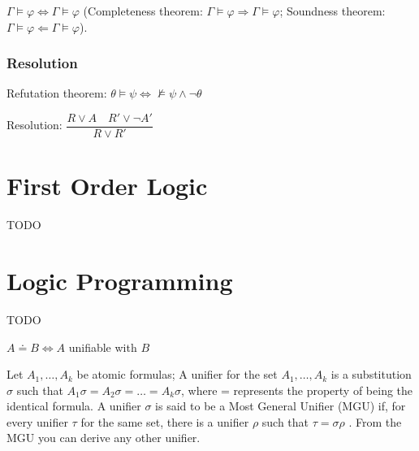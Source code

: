\documentclass[]{article}
\begin{document}
\noindent $\Gamma \models \varphi \iff \Gamma \models \varphi$ (Completeness theorem: $\Gamma \models \varphi \Rightarrow \Gamma \models \varphi$; Soundness theorem: $\Gamma \models \varphi \Leftarrow \Gamma \models \varphi$).

\subsubsection{Resolution}

\noindent Refutation theorem: $\theta \models \psi \iff \not\models \psi \land \neg\theta$

\noindent Resolution: $\dfrac{R \lor A \hspace{1em} R' \lor \neg A'}{R \lor R'}$

\section{First Order Logic}

TODO

\section{Logic Programming}

TODO

$ A \doteq B \Leftrightarrow A $ unifiable with $ B $

Let $A_1, \dots, A_k$ be atomic formulas; A unifier for the set ${A_1,\dots, A_k}$ is a substitution $\sigma$ such that $A_1 \sigma = A_2 \sigma = \dots = A_k \sigma$, where = represents the property of being the identical formula.
A unifier $\sigma$ is said to be a Most General Unifier (MGU) if, for every unifier $\tau$ for the same set, there is a unifier $\rho$ such that $\tau = \sigma \rho$ . From the MGU you can derive any other unifier.
\end{document}
